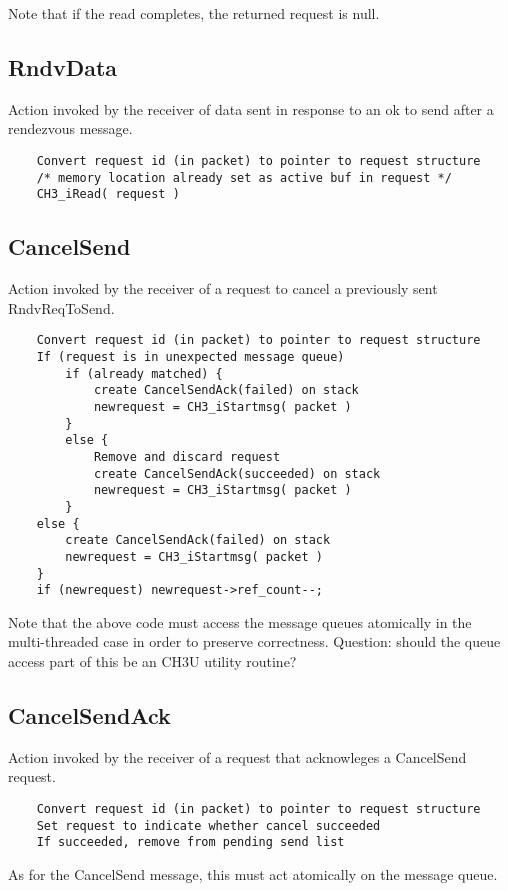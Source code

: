 \documentclass{article}
\begin{document}
Note that if the read completes, the returned request is null.

\subsection{RndvData}
Action invoked by the receiver of data sent in response to an ok to send after
a rendezvous message.
\begin{verbatim}
    Convert request id (in packet) to pointer to request structure
    /* memory location already set as active buf in request */
    CH3_iRead( request )
\end{verbatim}

\subsection{CancelSend}
Action invoked by the receiver of a request to cancel a previously sent
RndvReqToSend. 
\begin{verbatim}
    Convert request id (in packet) to pointer to request structure
    If (request is in unexpected message queue)
        if (already matched) {
            create CancelSendAck(failed) on stack
            newrequest = CH3_iStartmsg( packet )
        }
        else {
            Remove and discard request
            create CancelSendAck(succeeded) on stack
            newrequest = CH3_iStartmsg( packet )
        }
    else {
        create CancelSendAck(failed) on stack
        newrequest = CH3_iStartmsg( packet )
    }
    if (newrequest) newrequest->ref_count--;
\end{verbatim}
Note that the above code must access the message queues atomically in
the multi-threaded case in order to preserve correctness.  Question:
should the queue access part of this be an CH3U utility routine?

\subsection{CancelSendAck}
Action invoked by the receiver of a request that acknowleges a
CancelSend request.

\begin{verbatim}
    Convert request id (in packet) to pointer to request structure
    Set request to indicate whether cancel succeeded
    If succeeded, remove from pending send list
\end{verbatim}
As for the CancelSend message, this must act atomically on the message
queue.
\end{document}
